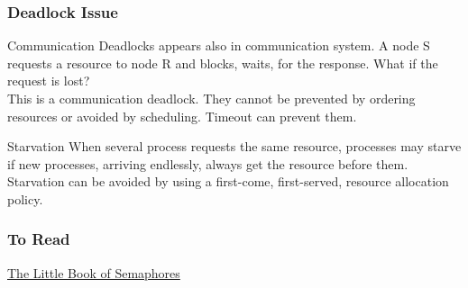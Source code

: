 \begin{frame}
  \frametitle{Deadlock Issue}
  \begin{block}{Communication}
    Deadlocks appears also in communication system. A node S requests a resource to node R and blocks, waits, for the response. What if the request is lost?\\
    This is a communication deadlock. They cannot be prevented by ordering resources or avoided by scheduling. Timeout can prevent them.
  \end{block}
  \begin{block}{Starvation}
    When several process requests the same resource, processes may starve if new processes, arriving endlessly, always get the resource before them.\\
    Starvation can be avoided by using a first-come, first-served, resource allocation policy.
  \end{block}
\end{frame}

\begin{frame}
    \frametitle{To Read}
    \color{blue}\href{http://www.greenteapress.com/semaphores/downey08semaphores.pdf}{The Little Book of Semaphores}

\end{frame}
